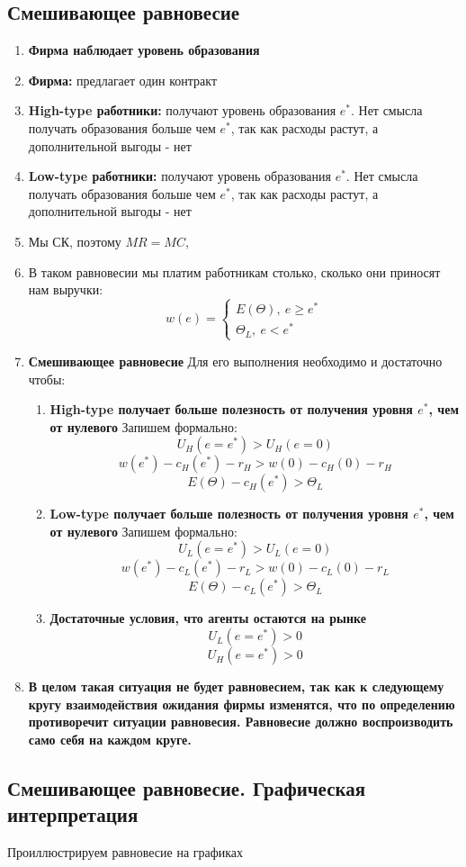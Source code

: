 \subsection{Смешивающее равновесие}
\begin{enumerate}
    \item \textbf{Фирма наблюдает уровень образования}
    \item \textbf{Фирма:} предлагает один контракт
    \item \textbf{High-type работники:} получают уровень образования $e^*$. Нет смысла получать образования больше чем $e^*$, так как расходы растут, а дополнительной выгоды - нет
    \item \textbf{Low-type работники:} получают уровень образования $e^*$. Нет смысла получать образования больше чем $e^*$, так как расходы растут, а дополнительной выгоды - нет
    \item Мы СК, поэтому $MR=MC$,
    \item В таком равновесии мы платим работникам столько, сколько они приносят нам выручки: $$w(e)=\begin{cases}
        E(\Theta), \ e \geq e^* \\
        \Theta_L, \ e < e^*
    \end{cases}$$
    \item \textbf{Смешивающее равновесие} Для его выполнения необходимо и достаточно чтобы:\begin{enumerate}
        \item \textbf{High-type получает больше полезность от получения уровня $e^*$, чем от нулевого} Запишем формально:$$U_H(e=e^*)>U_H(e=0)$$
        $$w(e^*)-c_H(e^*)-r_H>w(0)-c_H(0)-r_H$$
        $$E(\Theta)-c_H(e^*)>\Theta_L$$
        \item \textbf{Low-type получает больше полезность от получения уровня $e^*$, чем от нулевого} Запишем формально:$$U_L(e=e^*)>U_L(e=0)$$
        $$w(e^*)-c_L(e^*)-r_L>w(0)-c_L(0)-r_L$$
        $$E(\Theta)-c_L(e^*)>\Theta_L$$
        \item \textbf{Достаточные условия, что агенты остаются на рынке} $$U_L(e=e^*)>0$$
        $$U_H(e=e^*)>0$$
    \end{enumerate}
    \item \textbf{В целом такая ситуация не будет равновесием, так как к следующему кругу взаимодействия ожидания фирмы изменятся, что по определению противоречит ситуации равновесия. Равновесие должно воспроизводить само себя на каждом круге.}
\end{enumerate}
\subsection{Смешивающее равновесие. Графическая интерпретация}
\indent\setlength{\parindent}{1em}Проиллюстрируем равновесие на графиках
